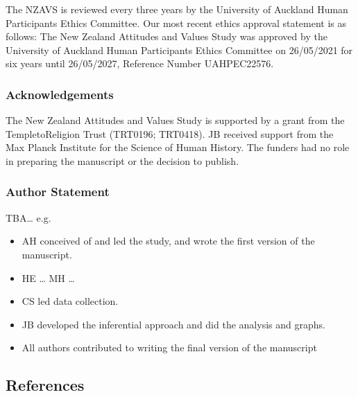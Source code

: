 \documentclass[
  singlecolumn]{article}
\providecommand{\tightlist}{%
  \setlength{\itemsep}{0pt}\setlength{\parskip}{0pt}}\usepackage{longtable,booktabs,array}
\begin{document}
The NZAVS is reviewed every three years by the University of Auckland
Human Participants Ethics Committee. Our most recent ethics approval
statement is as follows: The New Zealand Attitudes and Values Study was
approved by the University of Auckland Human Participants Ethics
Committee on 26/05/2021 for six years until 26/05/2027, Reference Number
UAHPEC22576.

\subsubsection{Acknowledgements}\label{acknowledgements}

The New Zealand Attitudes and Values Study is supported by a grant from
the TempletoReligion Trust (TRT0196; TRT0418). JB received support from
the Max Planck Institute for the Science of Human History. The funders
had no role in preparing the manuscript or the decision to publish.

\subsubsection{Author Statement}\label{author-statement}

TBA\ldots{} e.g.~

\begin{itemize}
\tightlist
\item
  AH conceived of and led the study, and wrote the first version of the
  manuscript.
\item
  HE \ldots{} MH \ldots{}
\item
  CS led data collection.
\item
  JB developed the inferential approach and did the analysis and
  graphs.\\
\item
  All authors contributed to writing the final version of the manuscript
\end{itemize}

\newpage{}

\subsection{References}\label{references}
\end{document}
